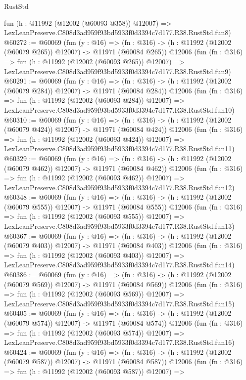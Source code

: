\begin{lexlean}{RustStd}
\begin{coremodule}
    fun (h : @11992 (@12002 (@60093 @358)) @12007) =>
    LexLeanPreserve.C808d3ad959f93bd5933f0d3394c7d177.R38.RustStd.fun8)
@60272 := @60069
    (fun (y : @16) =>
    (fn : @316) -> (h : @11992 (@12002 (@60079 @265)) @12007) -> @11971 (@60084 @265))
    @12006
    (fun (fn : @316) =>
    fun (h : @11992 (@12002 (@60093 @265)) @12007) =>
    LexLeanPreserve.C808d3ad959f93bd5933f0d3394c7d177.R38.RustStd.fun9)
@60291 := @60069
    (fun (y : @16) =>
    (fn : @316) -> (h : @11992 (@12002 (@60079 @284)) @12007) -> @11971 (@60084 @284))
    @12006
    (fun (fn : @316) =>
    fun (h : @11992 (@12002 (@60093 @284)) @12007) =>
    LexLeanPreserve.C808d3ad959f93bd5933f0d3394c7d177.R38.RustStd.fun10)
@60310 := @60069
    (fun (y : @16) =>
    (fn : @316) -> (h : @11992 (@12002 (@60079 @424)) @12007) -> @11971 (@60084 @424))
    @12006
    (fun (fn : @316) =>
    fun (h : @11992 (@12002 (@60093 @424)) @12007) =>
    LexLeanPreserve.C808d3ad959f93bd5933f0d3394c7d177.R38.RustStd.fun11)
@60329 := @60069
    (fun (y : @16) =>
    (fn : @316) -> (h : @11992 (@12002 (@60079 @462)) @12007) -> @11971 (@60084 @462))
    @12006
    (fun (fn : @316) =>
    fun (h : @11992 (@12002 (@60093 @462)) @12007) =>
    LexLeanPreserve.C808d3ad959f93bd5933f0d3394c7d177.R38.RustStd.fun12)
@60348 := @60069
    (fun (y : @16) =>
    (fn : @316) -> (h : @11992 (@12002 (@60079 @555)) @12007) -> @11971 (@60084 @555))
    @12006
    (fun (fn : @316) =>
    fun (h : @11992 (@12002 (@60093 @555)) @12007) =>
    LexLeanPreserve.C808d3ad959f93bd5933f0d3394c7d177.R38.RustStd.fun13)
@60367 := @60069
    (fun (y : @16) =>
    (fn : @316) -> (h : @11992 (@12002 (@60079 @403)) @12007) -> @11971 (@60084 @403))
    @12006
    (fun (fn : @316) =>
    fun (h : @11992 (@12002 (@60093 @403)) @12007) =>
    LexLeanPreserve.C808d3ad959f93bd5933f0d3394c7d177.R38.RustStd.fun14)
@60386 := @60069
    (fun (y : @16) =>
    (fn : @316) -> (h : @11992 (@12002 (@60079 @569)) @12007) -> @11971 (@60084 @569))
    @12006
    (fun (fn : @316) =>
    fun (h : @11992 (@12002 (@60093 @569)) @12007) =>
    LexLeanPreserve.C808d3ad959f93bd5933f0d3394c7d177.R38.RustStd.fun15)
@60405 := @60069
    (fun (y : @16) =>
    (fn : @316) -> (h : @11992 (@12002 (@60079 @574)) @12007) -> @11971 (@60084 @574))
    @12006
    (fun (fn : @316) =>
    fun (h : @11992 (@12002 (@60093 @574)) @12007) =>
    LexLeanPreserve.C808d3ad959f93bd5933f0d3394c7d177.R38.RustStd.fun16)
@60424 := @60069
    (fun (y : @16) =>
    (fn : @316) -> (h : @11992 (@12002 (@60079 @587)) @12007) -> @11971 (@60084 @587))
    @12006
    (fun (fn : @316) =>
    fun (h : @11992 (@12002 (@60093 @587)) @12007) =>

\end{coremodule}
\end{lexlean}
